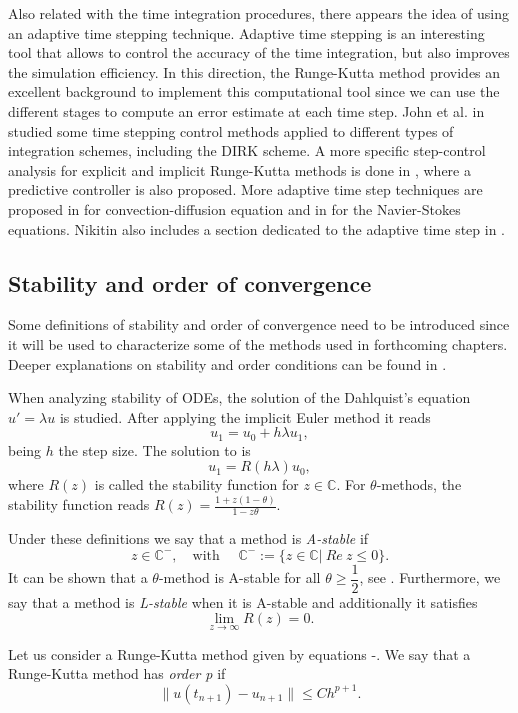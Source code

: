 Also related with the time integration procedures, there appears the idea of using an adaptive time stepping technique. Adaptive time stepping is an interesting tool that allows to control the accuracy of the time integration, but also improves the simulation efficiency. In this direction, the Runge-Kutta method provides an excellent background to implement this computational tool since we can use the different stages to compute an error estimate at each time step. John et al. in \cite{john_adaptive_2010} studied some time stepping control methods applied to different types of integration schemes, including the DIRK scheme. A more specific step-control analysis for explicit and implicit Runge-Kutta methods is done in \cite{hairer_solving_1993}, where a predictive controller is also proposed. More adaptive time step techniques are proposed in \cite{gresho_adaptive_2008} for convection-diffusion equation and in \cite{kay_adaptive_2010} for the Navier-Stokes equations. Nikitin also includes a section dedicated to the adaptive time step in \cite{nikitin_third-order-accurate_2006}.


\subsection{Stability and order of convergence}
Some definitions of stability and order of convergence need to be introduced since it will be used to characterize some of the methods used in forthcoming chapters. Deeper explanations on stability and order conditions can be found in \cite{hairer_solving_2008,hairer_solving_1993}.

When analyzing stability of ODEs, the solution of the Dahlquist's equation $ u'=\lambda u $ is studied. After applying the implicit Euler method it reads
\begin{equation}
\label{eq-C2_Dahlquist}
u_1=u_0+h\lambda u_1,
\end{equation}
being $ h $ the step size. The solution to  is
\begin{equation}
\label{eq-C2_Dahlquist_sol}
u_1=R(h\lambda)u_0,
\end{equation}
where $ R(z) $ is called the stability function for $ z\in\mathbb{C} $. For $ \theta $-methods, the stability function reads $ R(z)=\frac{1+z(1-\theta)}{1-z\theta} $.

Under these definitions we say that a method is \textit{A-stable} if 
\begin{equation}
\label{eq-C2_A_stable}
z\in\mathbb{C}^-,\quad\mbox{with $\quad\mathbb{C^-}:=\{z\in\mathbb{C}|\ Re\ z\le0\} $}.
\end{equation}
It can be shown that a $ \theta $-method is A-stable for all $ \theta\ge\dfrac{1}{2} $, see \cite{lambert_numerical_1991}. Furthermore, we say that a method is \textit{L-stable} when it is A-stable and additionally it satisfies
\begin{equation}
\label{eq-C2_L_stable}
\lim_{z\rightarrow\infty}R(z)=0.
\end{equation}

Let us consider a Runge-Kutta method given by equations -. We say that a Runge-Kutta method has \textit{order p} if 
\begin{equation}
\label{eq-C2_time_RK_order}
\|u(t_{n+1})-u_{n+1}\|\le Ch^{p+1}.
\end{equation}